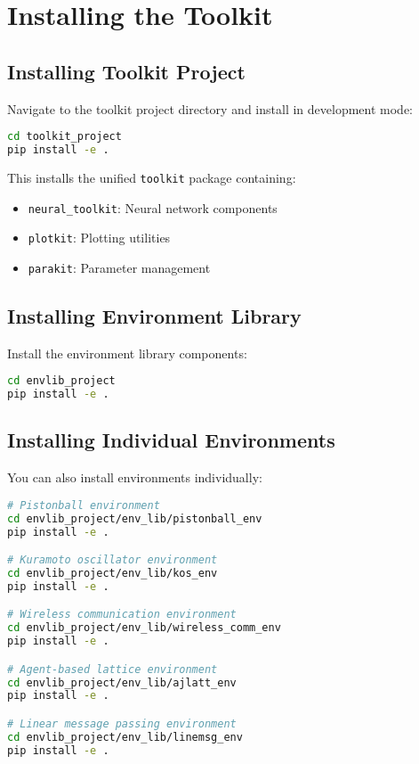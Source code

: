 \section{Installing the Toolkit}

\subsection{Installing Toolkit Project}

Navigate to the toolkit project directory and install in development mode:

\begin{lstlisting}[language=bash, caption=Installing toolkit project]
cd toolkit_project
pip install -e .
\end{lstlisting}

This installs the unified \texttt{toolkit} package containing:
\begin{itemize}
    \item \texttt{neural\_toolkit}: Neural network components
    \item \texttt{plotkit}: Plotting utilities
    \item \texttt{parakit}: Parameter management
\end{itemize}

\subsection{Installing Environment Library}

Install the environment library components:

\begin{lstlisting}[language=bash, caption=Installing environment library]
cd envlib_project
pip install -e .
\end{lstlisting}

\subsection{Installing Individual Environments}

You can also install environments individually:

\begin{lstlisting}[language=bash, caption=Installing individual environments]
# Pistonball environment
cd envlib_project/env_lib/pistonball_env
pip install -e .

# Kuramoto oscillator environment
cd envlib_project/env_lib/kos_env
pip install -e .

# Wireless communication environment
cd envlib_project/env_lib/wireless_comm_env
pip install -e .

# Agent-based lattice environment
cd envlib_project/env_lib/ajlatt_env
pip install -e .

# Linear message passing environment
cd envlib_project/env_lib/linemsg_env
pip install -e .
\end{lstlisting}

